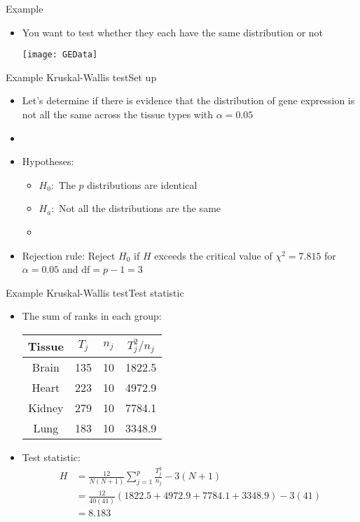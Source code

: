 \documentclass[xcolor=dvipsnames]{beamer}
\begin{document}
\begin{frame}{Example}
	\begin{itemize}
		\item You want to test whether they each have the same distribution or not
		\begin{center}
			\texttt{[image: GEData]}
		\end{center}
	\end{itemize}
\end{frame}

\begin{frame}{Example Kruskal-Wallis test}{Set up}
	\begin{itemize}
		\item Let's determine if there is evidence that the distribution of gene expression is not all the same across the tissue types with $\alpha = 0.05$ \pause
		\item[]
		\item Hypotheses: \pause
		\begin{itemize}
			\item $H_0:$ The $p$ distributions are identical \pause
			\item $H_a:$ Not all the distributions are the same \pause
			\item[]
		\end{itemize}
		\item Rejection rule: Reject $H_0$ if $H$ exceeds the critical value of $\chi^2 = 7.815$ for $\alpha = 0.05$ and $\text{df} = p - 1 = 3$
	\end{itemize}
\end{frame}

\begin{frame}{Example Kruskal-Wallis test}{Test statistic}
	\begin{itemize}
		\item The sum of ranks in each group: \pause
		\begin{center}
			\begin{tabular}{|c|c|c|c|}
				\hline
				\textbf{Tissue} &  $T_j$ & $n_j$ & $T_j^2 / n_j$  \\ \hline \hline  
				Brain & 135 & 10 & 1822.5 \\ \hline 
				Heart & 223 & 10 & 4972.9\\ \hline 
				Kidney & 279 & 10 & 7784.1\\ \hline 
				Lung & 183 & 10 & 3348.9\\ \hline 
			\end{tabular}
		\end{center}\pause 
		\item Test statistic: \pause
		\begin{align*}
			H &= \frac{12}{N (N+1)} \sum_{j=1}^p \frac{T_j^2}{n_j} - 3(N + 1) \\
			&= \frac{12}{40(41)} (1822.5 + 4972.9 + 7784.1 + 3348.9) - 3 (41) \\
			&= 8.183
		\end{align*}
	\end{itemize}
\end{frame}
\end{document}
